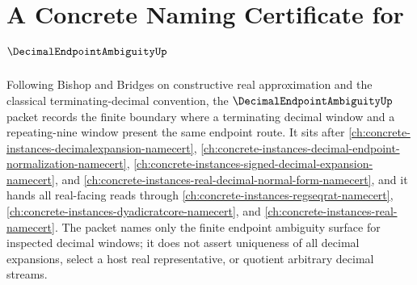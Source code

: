 \chapter{A Concrete Naming Certificate for $\DecimalEndpointAmbiguityUp$}
\label{ch:concrete-instances-decimal-endpoint-ambiguity-namecert}

Following Bishop and Bridges on constructive real approximation and the
classical terminating-decimal convention, the $\DecimalEndpointAmbiguityUp$
packet records the finite boundary where a terminating decimal window and a
repeating-nine window present the same endpoint route. It sits after
\autoref{ch:concrete-instances-decimalexpansion-namecert},
\autoref{ch:concrete-instances-decimal-endpoint-normalization-namecert},
\autoref{ch:concrete-instances-signed-decimal-expansion-namecert}, and
\autoref{ch:concrete-instances-real-decimal-normal-form-namecert}, and it
hands all real-facing reads through
\autoref{ch:concrete-instances-regseqrat-namecert},
\autoref{ch:concrete-instances-dyadicratcore-namecert}, and
\autoref{ch:concrete-instances-real-namecert}. The packet names only the
finite endpoint ambiguity surface for inspected decimal windows; it does not
assert uniqueness of all decimal expansions, select a host real
representative, or quotient arbitrary decimal streams.

